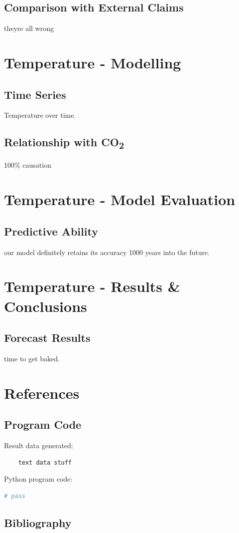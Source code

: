 \documentclass[12pt]{mcmthesis}
\begin{document}
    \subsection{Comparison with External Claims}
    they\textquotesingle re all wrong


    \section{Temperature - Modelling}

    \subsection{Time Series}
    Temperature over time.

    \subsection{Relationship with CO\textsubscript{2}}
    100\% causation


    \section{Temperature - Model Evaluation}

    \subsection{Predictive Ability}
    our model definitely retains its accuracy 1000 years into the future.


    \section{Temperature - Results \& Conclusions}

    \subsection{Forecast Results}
    time to get baked.


    \section{References}

    \subsection{Program Code}
    \noindent Result data generated:
    \begin{verbatim}
    text data stuff

    \end{verbatim}

    \noindent Python program code:
    \begin{lstlisting}[language=Python]
        # pass

    \end{lstlisting}

    \subsection{Bibliography}
\end{document}

